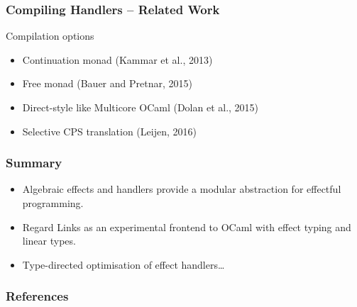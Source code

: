 \documentclass[10pt,compress]{beamer}
\begin{document}
\begin{frame}
  \frametitle{Compiling Handlers -- Related Work}
Compilation options
\begin{itemize}
  \item Continuation monad (Kammar et al., 2013)
  \item Free monad (Bauer and Pretnar, 2015)
  \item Direct-style like Multicore OCaml (Dolan et al., 2015)
  \item Selective CPS translation (Leijen, 2016)
\end{itemize}
\end{frame}

\begin{frame}
  \frametitle{Summary}
\begin{itemize}
\item Algebraic effects and handlers provide a modular abstraction for
  effectful programming.
\item Regard Links as an experimental frontend to OCaml with effect
  typing and linear types.
\item Type-directed optimisation of effect handlers\dots
\end{itemize}
\end{frame}

%


\begin{frame}[allowframebreaks]
  \frametitle{References}
  \nocite{*}
  
\end{frame}
\end{document}
